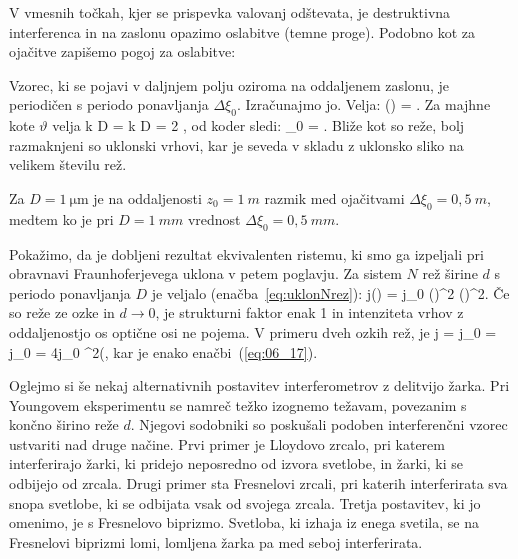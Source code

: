V vmesnih točkah, kjer se prispevka valovanj odštevata, je destruktivna
interferenca in na zaslonu opazimo oslabitve (temne proge). Podobno kot za ojačitve
zapišemo pogoj za oslabitve:

Vzorec, ki se pojavi v daljnjem polju oziroma na oddaljenem zaslonu,
je periodičen s periodo ponavljanja $\Delta \xi_0$. Izračunajmo jo. Velja:
\beq
\Delta \left(\right) = \pi.
\label{eq:06_19}
\eeq
Za majhne kote $\vartheta$ velja 
\beq
k D \Delta \vartheta = k D  = 2 \pi,
\label{eq:06_20}
\eeq
od koder sledi:
\beq
\Delta \xi_0 = .
\label{eq:06_21}
\eeq
Bliže kot so reže, bolj razmaknjeni so uklonski vrhovi, kar je seveda v skladu
z uklonsko sliko na velikem številu rež. 

Za $D=1~\si{\micro\metre}$ je na oddaljenosti $z_0 = 1~\si{m}$ razmik med ojačitvami
$\Delta \xi_0 = 0,5~\si{m}$, medtem ko je pri $D = 1~\si{mm}$ 
vrednost $\Delta \xi_0 = 0,5~\si{mm}$. 

Pokažimo, da je dobljeni rezultat ekvivalenten ristemu, ki smo ga izpeljali pri
obravnavi Fraunhoferjevega uklona v petem poglavju. Za sistem $N$ rež širine $d$
s periodo ponavljanja $D$ je veljalo (enačba~\ref{eq:uklonNrez}):
\beq
j(\vartheta) = j_0 \left(\right)^2
\left(\right)^2\!\!.
\label{eq:06_22}
\eeq
Če so reže ze ozke in $d\to 0$, je strukturni faktor enak 1 in intenziteta vrhov z oddaljenostjo
os optične osi ne pojema. V primeru dveh ozkih rež, je 
\beq
j = j_0  = 
j_0 
 = 4j_0 \cos^2\left(,
\label{eq:06_23}
\eeq
kar je enako enačbi~(\ref{eq:06_17}).

\begin{remark}
Oglejmo si še nekaj alternativnih postavitev interferometrov z delitvijo žarka. Pri Youngovem
eksperimentu se namreč težko izognemo težavam, povezanim s končno širino reže $d$. Njegovi
sodobniki so poskušali podoben interferenčni vzorec ustvariti nad druge načine. Prvi primer
je Lloydovo zrcalo, pri katerem interferirajo žarki, ki pridejo neposredno od izvora svetlobe, 
in žarki, ki se odbijejo od zrcala. Drugi primer sta Fresnelovi zrcali, pri katerih interferirata
sva snopa svetlobe, ki se odbijata vsak od svojega zrcala. Tretja postavitev, ki jo omenimo,
je s Fresnelovo biprizmo. Svetloba, ki izhaja iz enega svetila, se na Fresnelovi biprizmi
lomi, lomljena žarka pa med seboj interferirata.
\end{remark}

